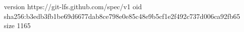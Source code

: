 version https://git-lfs.github.com/spec/v1
oid sha256:b3edb3fb1be69d6677dab8ce798e0e85c48e9b5cf1e2f492c737d006ca92fb65
size 1165
